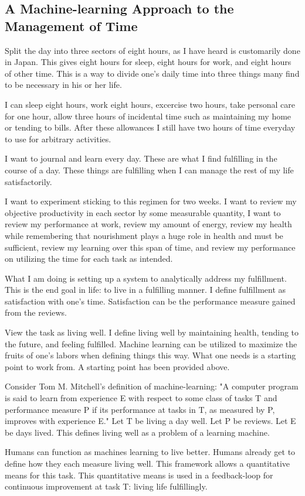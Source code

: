\subsection*{ A Machine-learning Approach to the Management of Time }
Split the day into three sectors of eight hours, as I have heard is customarily done in Japan. This gives eight hours for sleep, eight hours for work, and eight hours of other time. This is a way to divide one's daily time into three things many find to be necessary in his or her life.

I can sleep eight hours, work eight hours, excercise two hours, take personal care for one hour, allow three hours of incidental time such as maintaining my home or tending to bills. After these allowances I still have two hours of time everyday to use for arbitrary activities.

I want to journal and learn every day. These are what I find fulfilling in the course of a day. These things are fulfilling when I can manage the rest of my life satisfactorily.

I want to experiment sticking to this regimen for two weeks. I want to review my objective productivity in each sector by some measurable quantity, I want to review my performance at work, review my amount of energy, review my health while remembering that nourishment plays a huge role in health and must be sufficient, review my learning over this span of time, and review my performance on utilizing the time for each task as intended.

What I am doing is setting up a system to analytically address my fulfillment. This is the end goal in life: to live in a fulfilling manner. I define fulfillment as satisfaction with one's time. Satisfaction can be the performance measure gained from the reviews.

View the task as living well. I define living well by maintaining health, tending to the future, and feeling fulfilled. Machine learning can be utilized to maximize the fruits of one's labors when defining things this way. What one needs is a starting point to work from. A starting point has been provided above. 

Consider Tom M. Mitchell's definition of machine-learning: "A computer program is said to learn from experience E with respect to some class of tasks T and performance measure P if its performance at tasks in T, as measured by P, improves with experience E." Let T be living a day well. Let P be reviews. Let E be days lived. This defines living well as a problem of a learning machine.

Humans can function as machines learning to live better. Humans already get to define how they each measure living well. This framework allows a quantitative means for this task. This quantitative means is used in a feedback-loop for continuous improvement at task T: living life fulfillingly.
